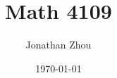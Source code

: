 \documentclass[11pt,letterpaper]{book}
\begin{document}
\frontmatter
\title{Math 4109}
\author{Jonathan Zhou}
\date{\today}
\maketitle

\tableofcontents
\mainmatter





\appendix


\end{document}

